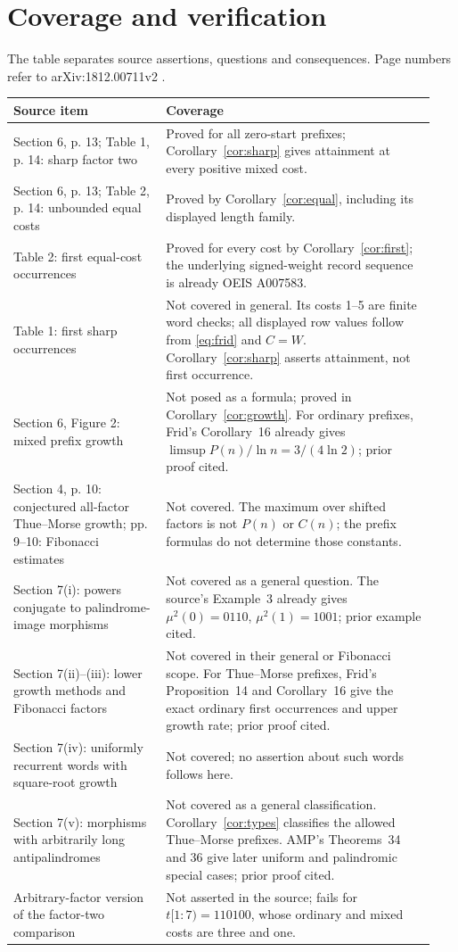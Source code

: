 \documentclass[11pt]{article}
\begin{document}
\section{Coverage and verification}
The table separates source assertions, questions and consequences.
Page numbers refer to arXiv:1812.00711v2 \cite{AKMP}.
\begingroup\small
\begin{longtable}{@{}p{0.34\linewidth}p{0.60\linewidth}@{}}
\toprule
Source item&Coverage\\\midrule
Section 6, p. 13; Table 1, p. 14: sharp factor two&
Proved for all zero-start prefixes; Corollary~\ref{cor:sharp} gives
attainment at every positive mixed cost.\\[3pt]
Section 6, p. 13; Table 2, p. 14: unbounded equal costs&
Proved by Corollary~\ref{cor:equal}, including its displayed length family.\\[3pt]
Table 2: first equal-cost occurrences&
Proved for every cost by Corollary~\ref{cor:first}; the underlying signed-weight
record sequence is already OEIS A007583.\\[3pt]
Table 1: first sharp occurrences&
Not covered in general. Its costs 1--5 are finite word checks;
all displayed row values follow from \eqref{eq:frid} and $C=W$.
Corollary~\ref{cor:sharp} asserts attainment, not first occurrence.\\[3pt]
Section 6, Figure 2: mixed prefix growth&
Not posed as a formula; proved in Corollary~\ref{cor:growth}.
For ordinary prefixes, Frid's Corollary~16 already gives
$\limsup P(n)/\ln n=3/(4\ln2)$; prior proof cited.\\[3pt]
Section 4, p. 10: conjectured all-factor Thue--Morse growth;
pp. 9--10: Fibonacci estimates&
Not covered. The maximum over shifted factors is not $P(n)$ or $C(n)$;
the prefix formulas do not determine those constants.\\[3pt]
Section 7(i): powers conjugate to palindrome-image morphisms&
Not covered as a general question. The source's Example~3 already gives
$\mu^2(0)=0110$, $\mu^2(1)=1001$; prior example cited.\\[3pt]
Section 7(ii)--(iii): lower growth methods and Fibonacci factors&
Not covered in their general or Fibonacci scope. For Thue--Morse prefixes,
Frid's Proposition~14 and Corollary~16 give the exact ordinary first
occurrences and upper growth rate; prior proof cited.\\[3pt]
Section 7(iv): uniformly recurrent words with square-root growth&
Not covered; no assertion about such words follows here.\\[3pt]
Section 7(v): morphisms with arbitrarily long antipalindromes&
Not covered as a general classification. Corollary~\ref{cor:types}
classifies the allowed Thue--Morse prefixes. AMP's Theorems~34 and 36
give later uniform and palindromic special cases; prior proof cited.\\[3pt]
Arbitrary-factor version of the factor-two comparison&
Not asserted in the source; fails for $t[1:7)=110100$,
whose ordinary and mixed costs are three and one.\\
\bottomrule
\end{longtable}
\endgroup
\end{document}
